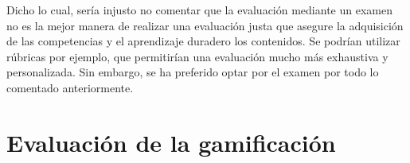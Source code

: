 Dicho lo cual, sería injusto no comentar que la evaluación mediante un examen no es la mejor manera de realizar una evaluación justa que asegure la adquisición de las competencias y el aprendizaje duradero los contenidos.
%
Se podrían utilizar rúbricas por ejemplo, que permitirían una evaluación mucho más exhaustiva y personalizada.
%
Sin embargo, se ha preferido optar por el examen por todo lo comentado anteriormente.






\section{Evaluación de la gamificación}

